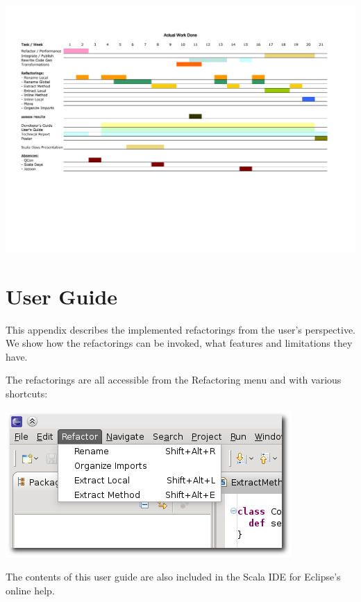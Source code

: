 \documentclass[10pt,a4paper,oneside]{scrreprt}
\begin{document}
\newpage
\thispagestyle{empty}
\enlargethispage{5cm}
\begin{center}
  \includegraphics[width=1.7\linewidth,angle=90]{project_plan_2.pdf}

\label{end-chapter:project-environment}
\end{center}


\chapter{User Guide} \label{chapter:user-guide}

This appendix describes the implemented refactorings from the user's perspective. We show how the refactorings can be invoked, what features and limitations they have.

The refactorings are all accessible from the Refactoring menu and with various shortcuts:

\begin{center}
  \includegraphics[width=0.6\linewidth]{refactoring-menu-screenshot.png}
\end{center}

The contents of this user guide are also included in the Scala IDE for Eclipse's online help.
\end{document}

